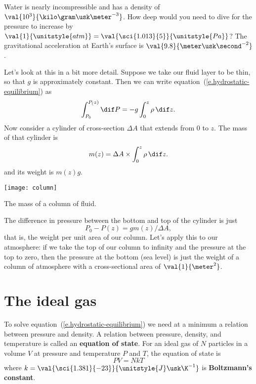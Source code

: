 \begin{exercisebox}
Water is nearly incompressible and has a density of $\val{10^{3}}{\kilo\gram\usk\meter^{-3}}$.  How deep would you need to dive for the pressure to increase by $\val{1}{\unitstyle{atm}} = \val{\sci{1.013}{5}}{\unitstyle{Pa}}$?  The gravitational acceleration at Earth's surface is $\val{9.8}{\meter\usk\second^{-2}}$.
\end{exercisebox}

Let's look at this in a bit more detail.  Suppose we take our fluid layer to be thin, so that $g$ is approximately constant. Then we can write equation~(\ref{e.hydrostatic-equilibrium}) as
\[ \int_{P_{0}}^{P_(z)} \dif P = -g\int_{0}^{z} \rho\,\dif z. \]
Now consider a cylinder of cross-section $\Delta A$ that extends from $0$ to $z$.  The mass of that cylinder is
\[ m(z) = \Delta A\times\int_{0}^{z}\rho \,\dif z.
\]
and its weight is $m(z)g$.
\begin{marginfigure}
\centering\texttt{[image: column]}
\caption[The mass of a column of fluid]{
The mass of a column of fluid.
\label{f.column}}
\end{marginfigure}

The difference in pressure between the bottom and top of the cylinder is just
\[ P_{0}-P(z) = g m(z)/\Delta A, \]
that is, the weight per unit area of our column.  Let's apply this to our atmosphere:
if we take the top of our column to infinity and the pressure at the top to zero, then the pressure at the bottom (sea level) is just the weight of a column of atmosphere with a cross-sectional area of $\val{1}{\meter^{2}}$.

\section{The ideal gas}\label{s.ideal-gas}
To solve equation~(\ref{e.hydrostatic-equilibrium}) we need at a minimum a relation between pressure and density. A relation between pressure, density, and temperature is called an \textbf{equation of state}.
For an ideal gas of $N$ particles in a volume $V$ at pressure and temperature $P$ and $T$, the equation of state is
\begin{equation}\label{e.ideal-gas-eos}
PV = NkT
\end{equation}
where $k = \val{\sci{1.381}{-23}}{\unitstyle{J}\usk\K^{-1}}$ is \textbf{Boltzmann's constant}.

